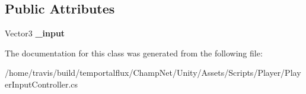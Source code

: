\subsection*{Public Attributes}
\begin{DoxyCompactItemize}
\item 
\hypertarget{class_player_input_controller_ae7ad9ffda52758888cf9d6940d52e589}{Vector3 {\bfseries \-\_\-input}}\label{class_player_input_controller_ae7ad9ffda52758888cf9d6940d52e589}

\end{DoxyCompactItemize}


The documentation for this class was generated from the following file\-:\begin{DoxyCompactItemize}
\item 
/home/travis/build/temportalflux/\-Champ\-Net/\-Unity/\-Assets/\-Scripts/\-Player/Player\-Input\-Controller.\-cs\end{DoxyCompactItemize}
